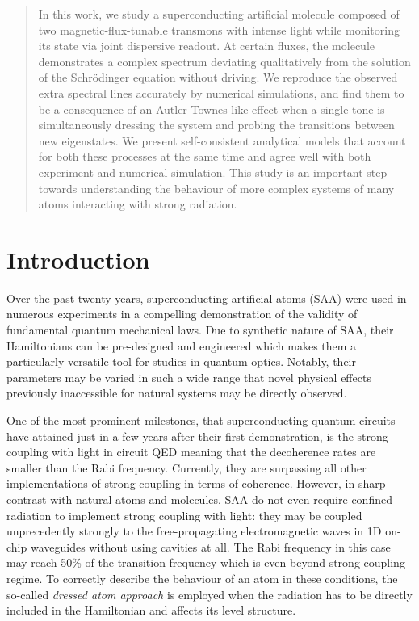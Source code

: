 \documentclass[%
 prx,
 amsmath,amssymb,
 reprint,%
]{revtex4-1}
\begin{document}
	
	\begin{abstract}
	In this work, we study a superconducting artificial molecule composed of two magnetic-flux-tunable transmons with intense light while monitoring its state via joint dispersive readout. At certain fluxes, the molecule demonstrates a complex spectrum deviating qualitatively from the solution of the Schrödinger equation without driving. We reproduce the observed extra spectral lines accurately by numerical simulations, and find them to be a consequence of an Autler-Townes-like effect when a single tone is simultaneously dressing the system and probing the transitions between new eigenstates. We present self-consistent analytical models that account for both these processes at the same time and agree well with both experiment and numerical simulation. This study is an important step towards understanding the behaviour of more complex systems of many atoms interacting with strong radiation.
	\end{abstract}
	
	\maketitle
\section{Introduction}





Over the past twenty years, superconducting artificial atoms (SAA) were used in numerous experiments in a compelling demonstration of the validity of fundamental quantum mechanical laws\cite{you2011atomic}. Due to synthetic nature of SAA, their Hamiltonians can be pre-designed and engineered which makes them a particularly versatile tool for studies in quantum optics. Notably, their parameters may be varied in such a wide range that novel physical effects previously inaccessible for natural systems may be directly observed. 

One of the most prominent milestones, that superconducting quantum circuits have attained just in a few years after their first demonstration, is the strong coupling with light in {circuit QED}\cite{wallraff2004strong, chiorescu2004coherent} meaning that the decoherence rates are smaller than the Rabi frequency. Currently, they are surpassing all other implementations of strong coupling in terms of coherence\cite{forn2019ultrastrong}. 
However, in sharp contrast with natural atoms and molecules, SAA do not even require confined radiation to implement strong coupling with light: they may be coupled unprecedently strongly to the free-propagating electromagnetic waves in 1D on-chip waveguides\cite{astafiev2010resonance} without using cavities at all. The Rabi frequency in this case may reach 50\% of the transition frequency\cite{deng2015observation} which is even beyond strong coupling regime\cite{forn2019ultrastrong}. To correctly describe the behaviour of an atom in these conditions, the so-called \textit{dressed atom approach}\cite{cohen1998atom} is employed when the radiation has to be directly included in the Hamiltonian and affects its level structure.
\end{document}
